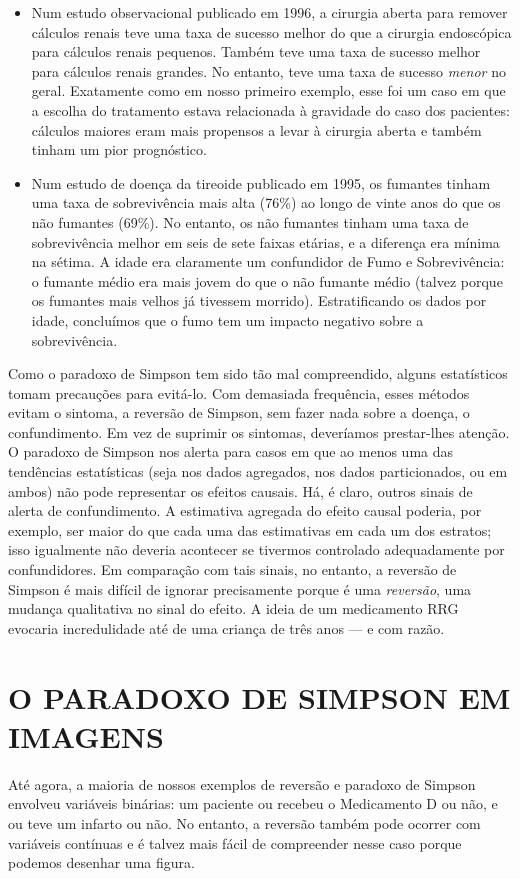\documentclass[11pt,a5paper,twoside]{book}
\begin{document}
\begin{itemize}
\item Num estudo observacional publicado em 1996, a cirurgia aberta para remover cálculos renais teve uma taxa de sucesso melhor do que a cirurgia endoscópica para cálculos renais pequenos. Também teve uma taxa de sucesso melhor para cálculos renais grandes. No entanto, teve uma taxa de sucesso \textit{menor} no geral. Exatamente como em nosso primeiro exemplo, esse foi um caso em que a escolha do tratamento estava relacionada à gravidade do caso dos pacientes: cálculos maiores eram mais propensos a levar à cirurgia aberta e também tinham um pior prognóstico.
\item Num estudo de doença da tireoide publicado em 1995, os fumantes tinham uma taxa de sobrevivência mais alta (76\%) ao longo de vinte anos do que os não fumantes (69\%). No entanto, os não fumantes tinham uma taxa de sobrevivência melhor em seis de sete faixas etárias, e a diferença era mínima na sétima. A idade era claramente um confundidor de Fumo e Sobrevivência: o fumante médio era mais jovem do que o não fumante médio (talvez porque os fumantes mais velhos já tivessem morrido). Estratificando os dados por idade, concluímos que o fumo tem um impacto negativo sobre a sobrevivência.
\end{itemize}
Como o paradoxo de Simpson tem sido tão mal compreendido, alguns estatísticos tomam precauções para evitá-lo. Com demasiada frequência, esses métodos evitam o sintoma, a reversão de Simpson, sem fazer nada sobre a doença, o confundimento. Em vez de suprimir os sintomas, deveríamos prestar-lhes atenção. O paradoxo de Simpson nos alerta para casos em que ao menos uma das tendências estatísticas (seja nos dados agregados, nos dados particionados, ou em ambos) não pode representar os efeitos causais. Há, é claro, outros sinais de alerta de confundimento. A estimativa agregada do efeito causal poderia, por exemplo, ser maior do que cada uma das estimativas em cada um dos estratos; isso igualmente não deveria acontecer se tivermos controlado adequadamente por confundidores. Em comparação com tais sinais, no entanto, a reversão de Simpson é mais difícil de ignorar precisamente porque é uma \textit{reversão}, uma mudança qualitativa no sinal do efeito. A ideia de um medicamento RRG evocaria incredulidade até de uma criança de três anos — e com razão.

\section{O PARADOXO DE SIMPSON EM IMAGENS}
Até agora, a maioria de nossos exemplos de reversão e paradoxo de Simpson envolveu variáveis binárias: um paciente ou recebeu o Medicamento D ou não, e ou teve um infarto ou não. No entanto, a reversão também pode ocorrer com variáveis contínuas e é talvez mais fácil de compreender nesse caso porque podemos desenhar uma figura.
\end{document}
